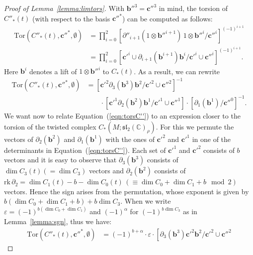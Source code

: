 \documentclass[a4paper]{amsart}
\theoremstyle{plain}
\theoremstyle{definition}
\theoremstyle{remark}
\newcommand{\CC}{{\mathbb C}}
\newcommand{\rk}{\mathrm{rk}\,}
\newcommand{\sllrho}{\mathfrak{sl}_2(\CC)_\rho}
\newcommand{\Tor}[3]{\mathrm{Tor} ({#1}, {#2}, {#3})}
\newcommand{\cbasis}[2][c]{\mathbf{#1}^{#2}}
\newcommand{\bbasis}[2][b]{\mathbf{#1}^{#2}}
\begin{document}
\begin{proof}[Proof of Lemma~\ref{lemma:limtors}]
  With $\bbasis[b'']{3} = \cbasis[c'']{3}$ in mind, the torsion of $C''_*(t)$ (with respect to the basis
  $\cbasis[c'']{*}$) can be computed as follows:
  \begin{align*}
    \Tor{C''_*(t)}{\cbasis[c'']{*}}{\emptyset} &= \prod_{i=0}^{2}
    \left[
      \partial''_{i+1} (1 \otimes \bbasis[b'']{i+1})\, 1 \otimes
      \bbasis[b'']{i} / \cbasis[c'']{i}
    \right]^{(-1)^{i+1}} \\
    &= \prod_{i=0}^2 \left[ \cbasis[c']{i} \cup \partial_{i+1}
      (\bbasis[b]{i+1}) \bbasis[b]{i} / \cbasis[c']{i} \cup
      \cbasis[c'']{i} \right]^{(-1)^{i+1}}.
  \end{align*}
  Here $\bbasis[b]{i}$ denotes a lift of $1 \otimes \bbasis[b'']{i}$
  to $C_*(t)$.  As a result, we can rewrite 
  \begin{align}\label{eqn:torsC''}
    \Tor{C''_*(t)}{\cbasis[c'']{*}}{\emptyset}
    &= 
    \left[ 
      \cbasis[c']{2} \partial_3(\bbasis{3}) \bbasis{2} / \cbasis[c']{2} \cup \cbasis[c'']{2} 
    \right]^{-1} \\
   & \qquad
    \cdot
    \left[ 
      \cbasis[c']{1} \partial_2(\bbasis{2}) \bbasis{1} / 
      \cbasis[c']{1} \cup \cbasis[c'']{1} 
    \right]
    \cdot
    \left[
        \partial_1( \bbasis{1}) / \cbasis[c'']{0} 
      \right]^{-1}. \nonumber
  \end{align}
  We want now to relate Equation~(\ref{eqn:torsC''}) to an expression
  closer to the torsion of the twisted complex $C_*(M; \sllrho)$. For this we permute the
  vectors of $\partial_2(\bbasis{2})$ and $\partial_1(\bbasis{1})$
  with the ones of $\cbasis[c']{2}$ and $\cbasis[c']{1}$ in one of the
  determinants in Equation~(\ref{eqn:torsC''}). Each set of
  $\cbasis[c']{1}$ and $\cbasis[c']{2}$ consists of $b$ vectors and it
  is easy to observe that $\partial_3(\bbasis{3})$ consists of $\dim
  C_3(t) ( = \dim C_3)$ vectors and $\partial_2(\bbasis{2})$ consists
  of $\rk \partial_2 = \dim C_1(t) - b - \dim C_0(t) \, (\equiv \dim
  C_0 + \dim C_1 + b \mod 2)$ vectors.  Hence the sign arises from the permutation, 
   whose exponent is given by $b(\dim C_0 + \dim C_1 + b) + b
  \dim C_3$.  When we write $\varepsilon = (-1)^{b(\dim C_0 + \dim
    C_1)}$ and $(-1)^\alpha$ for $(-1)^{b \dim C_3}$ as in Lemma~\ref{lemma:sgn}, thus we have:
  \begin{align}\label{eqn:tors1}
    \Tor{C''_*(t)}{\cbasis[c'']{*}}{\emptyset}
    &= (-1)^{b + \alpha} \cdot \varepsilon \cdot
    \left[ 
      \partial_3(\bbasis{3}) \cbasis[c']{2} \bbasis{2} / \cbasis[c']{2} \cup \cbasis[c'']{2} 

\end{align}
\end{proof}
\end{document}
